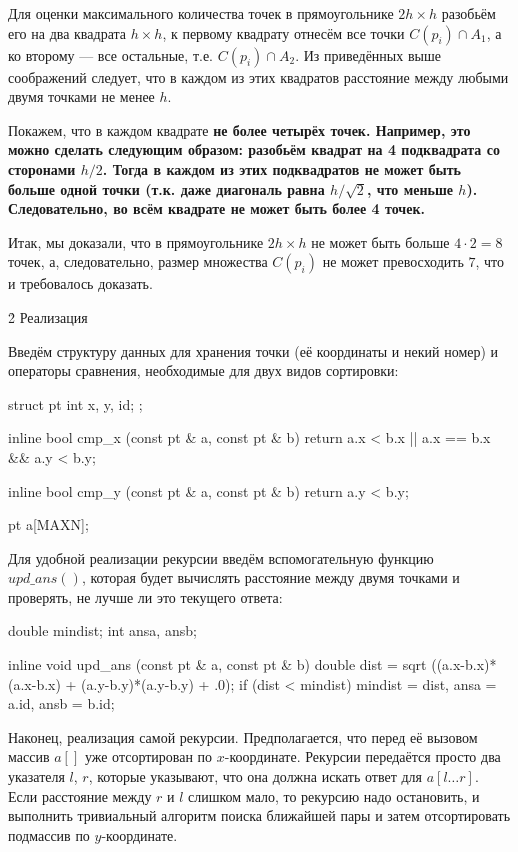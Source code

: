 Для оценки максимального количества точек в прямоугольнике $2h \times h$ разобьём его на два квадрата $h \times h$, к первому квадрату отнесём все точки $C(p_i) \cap A_1$, а ко второму --- все остальные, т.е. $C(p_i) \cap A_2$. Из приведённых выше соображений следует, что в каждом из этих квадратов расстояние между любыми двумя точками не менее $h$.

Покажем, что в каждом квадрате \bf{не более четырёх} точек. Например, это можно сделать следующим образом: разобьём квадрат на 4 подквадрата со сторонами $h/2$. Тогда в каждом из этих подквадратов не может быть больше одной точки (т.к. даже диагональ равна $h / \sqrt{2}$, что меньше $h$). Следовательно, во всём квадрате не может быть более 4 точек.

Итак, мы доказали, что в прямоугольнике $2h \times h$ не может быть больше $4 \cdot 2 = 8$ точек, а, следовательно, размер множества $C(p_i)$ не может превосходить $7$, что и требовалось доказать.


\h2{ Реализация }

Введём структуру данных для хранения точки (её координаты и некий номер) и операторы сравнения, необходимые для двух видов сортировки:

\code
struct pt {
	int x, y, id;
};

inline bool cmp_x (const pt & a, const pt & b) {
	return a.x < b.x || a.x == b.x && a.y < b.y;
}

inline bool cmp_y (const pt & a, const pt & b) {
	return a.y < b.y;
}

pt a[MAXN];
\endcode

Для удобной реализации рекурсии введём вспомогательную функцию $upd\_ans()$, которая будет вычислять расстояние между двумя точками и проверять, не лучше ли это текущего ответа:

\code
double mindist;
int ansa, ansb;

inline void upd_ans (const pt & a, const pt & b) {
	double dist = sqrt ((a.x-b.x)*(a.x-b.x) + (a.y-b.y)*(a.y-b.y) + .0);
	if (dist < mindist)
		mindist = dist,  ansa = a.id,  ansb = b.id;
}
\endcode

Наконец, реализация самой рекурсии. Предполагается, что перед её вызовом массив $a[]$ уже отсортирован по $x$-координате. Рекурсии передаётся просто два указателя $l$, $r$, которые указывают, что она должна искать ответ для $a[l \ldots r]$. Если расстояние между $r$ и $l$ слишком мало, то рекурсию надо остановить, и выполнить тривиальный алгоритм поиска ближайшей пары и затем отсортировать подмассив по $y$-координате.

